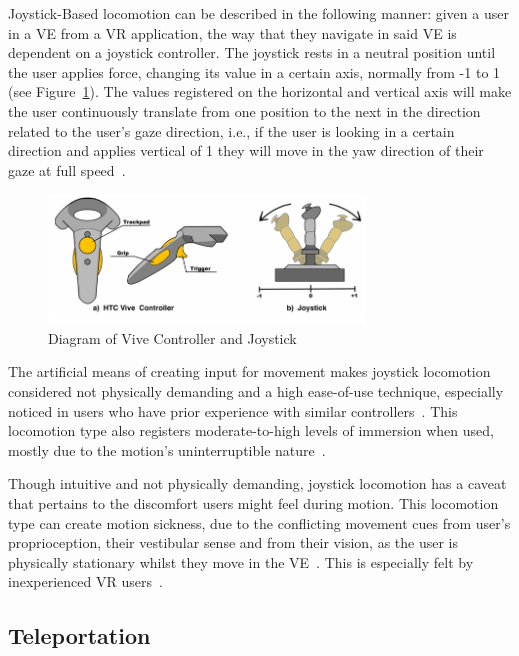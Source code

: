 Joystick-Based locomotion can be described in the following manner: given a user in a \gls{VE} from a \gls{VR} application, 
the way that they navigate in said \gls{VE} is dependent on a joystick controller. The joystick rests in a neutral position until the user
applies force, changing its value in a certain axis, normally from -1 to 1 (see Figure~\ref{fig:vive-joystick}). The values registered 
on the horizontal and vertical axis will make the user continuously translate from one position to the next in the 
direction related to the user's gaze direction, i.e., if the user is looking in a certain direction and applies vertical of 1 
they will move in the yaw direction of their gaze at full speed~\cite{Coomer2018}.
\begin{figure}[t]
    \centering
    \includegraphics[width=0.75\textwidth]{NOVAthesisFiles/Images/papers/vive-joystick.png}
    \caption[Diagram of Vive Controller and Joystick]{Diagram of Vive Controller and Joystick~\cite{Coomer2018}}
    \label{fig:vive-joystick}
\end{figure}
The artificial means of creating input for movement makes joystick locomotion considered not physically demanding and a high ease-of-use 
technique, especially noticed in users who have prior experience with similar controllers~\cite{Nasiri2023}. This locomotion type also registers 
moderate-to-high levels of immersion when used, mostly due to the motion's uninterruptible nature~\cite{Boletsis2019}.

Though intuitive and not physically demanding, joystick locomotion has a caveat that pertains to the discomfort users might feel during motion. 
This locomotion type can create
motion sickness, due to the conflicting movement cues from user's proprioception, their vestibular sense and from their vision, as the user 
is physically stationary whilst they move in the \gls{VE}~\cite{Langbehn2018}. This is especially felt by inexperienced \gls{VR} users~\cite{Nasiri2023}.

\subsection{Teleportation}
\label{sec:teleportation}

